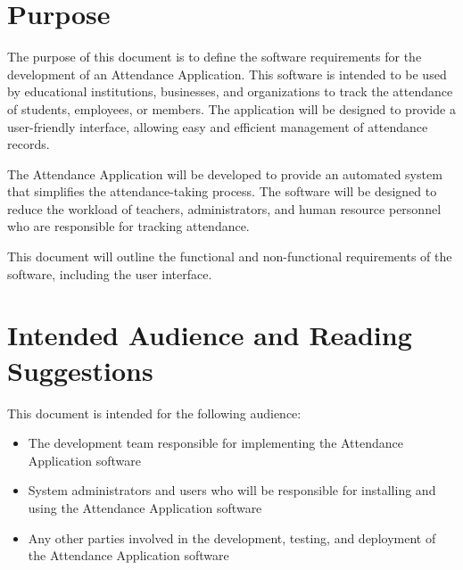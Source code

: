 \documentclass{scrreprt}
\begin{document}
\section{Purpose}
The purpose of this document is to define the software requirements for the development of an Attendance Application. This software is intended to be used by educational institutions, businesses, and organizations to track the attendance of students, employees, or members. The application will be designed to provide a user-friendly interface, allowing easy and efficient management of attendance records.

The Attendance Application will be developed to provide an automated system that simplifies the attendance-taking process. The software will be designed to reduce the workload of teachers, administrators, and human resource personnel who are responsible for tracking attendance.

This document will outline the functional and non-functional requirements of the software, including the user interface.


\section{Intended Audience and Reading Suggestions}
This document is intended for the following audience:
\begin{itemize}
    \item The development team responsible for implementing the Attendance Application software
    \item System administrators and users who will be responsible for installing and using the Attendance Application software
    \item Any other parties involved in the development, testing, and deployment of the Attendance Application software
\end{itemize}
\end{document}

